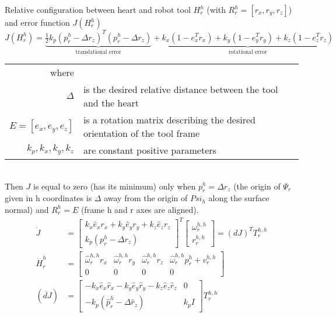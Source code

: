 Relative configuration between heart and robot tool $H^h_r$ (with $R^h_r =[r_x, r_y, r_z]$) and error function $J(H^h_r)$
\begin{equation}
J(H^h_r) = \underbrace{\tfrac{1}{2}k_p (p^h_r-\Delta r_z)^T(p^h_r-\Delta r_z)}_\text{translational error} + \underbrace{k_x (1-e_x^T r_x) + k_y (1-e_y^T r_y) + k_z (1-e_z^T r_z)}_\text{rotational error}
\end{equation}
\begin{tabular}{rl}
	where &\\
	$\Delta$ & is the desired relative distance between the tool and the heart\\
	$E=[e_x,e_y,e_z]$ & is a rotation matrix describing the desired orientation of the tool frame\\
	$k_p,k_x,k_y,k_z$ & are constant positive parameters\\
\end{tabular}\\

Then $J$ is equal to zero (has its minimum) only when $p^h_r=\Delta r_z$ (the origin of $\Psi_r$ given in h coordinates is $\Delta$ away from the origin of $Psi_h$ along the surface normal) and $R^h_r=E$ (frame h and r axes are aligned).
\begin{align}
\dot{J} &= 
\begin{bmatrix}
k_x \hat{e}_x r_x + k_y \hat{e}_y r_y + k_z \hat{e}_z r_z\\
k_p(p^h_r - \Delta r_z)
\end{bmatrix}^T
\begin{bmatrix}
\omega^{h,h}_r \\
r^{h,h}_r
\end{bmatrix}
= (dJ)^T T^{h,h}_r\\
\dot{H}^h_r &= 
\begin{bmatrix}
\hat{\omega}^{h,h}_r r_x & \hat{\omega}^{h,h}_r r_y & \hat{\omega}^{h,h}_r r_z & \hat{\omega}^{h,h}_r p^h_r + v^{h,h}_r\\
0 & 0 & 0 & 0
\end{bmatrix}\\
(\dot{dJ}) &=
\begin{bmatrix}
-k_x \hat{e}_x \hat{r}_x  - k_y \hat{e}_y \hat{r}_y - k_z \hat{e}_z \hat{r}_z & 0\\
-k_p(\hat{p}^h_r - \Delta \hat{r}_z) & k_p I
\end{bmatrix}
T^{h,h}_r
\end{align}

